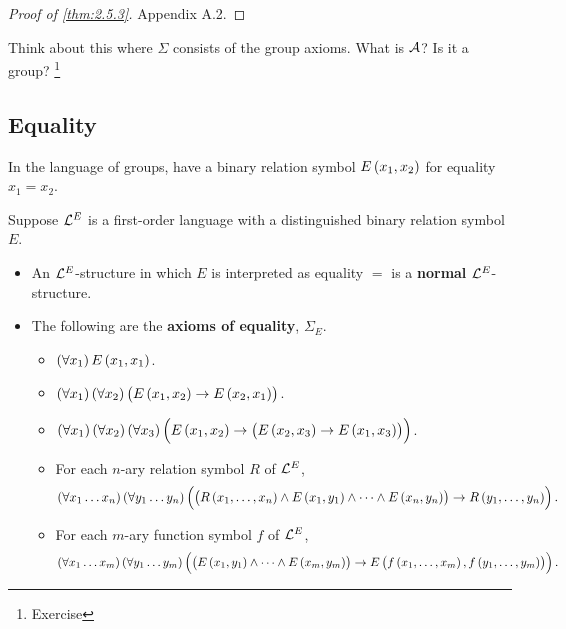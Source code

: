 
\begin{proof}[Proof of \ref{thm:2.5.3}]
Appendix A.2.
\end{proof}

\begin{example*}
Think about this where $ \Sigma $ consists of the group axioms. What is $ \mathcal{A} $? Is it a group? \footnote{Exercise}
\end{example*}

\subsection{Equality}


\begin{example*}
In the language of groups, have a binary relation symbol $ E\br{x_1, x_2} $ for equality $ x_1 = x_2 $.
\end{example*}

\begin{definition}
Suppose $ \mathcal{L}^E $ is a first-order language with a distinguished binary relation symbol $ E $.
\begin{itemize}
\item An $ \mathcal{L}^E $-structure in which $ E $ is interpreted as equality $ = $ is a \textbf{normal} $ \mathcal{L}^E $-structure.
\item The following are the \textbf{axioms of equality}, $ \Sigma_E $.
\begin{itemize}
\item $ \fab{x_1}E\br{x_1, x_1} $.
\item $ \fab{x_1}\fab{x_2}\impb{E\br{x_1, x_2}}{E\br{x_2, x_1}} $.
\item $ \fab{x_1}\fab{x_2}\fab{x_3}\impb{E\br{x_1, x_2}}{\impb{E\br{x_2, x_3}}{E\br{x_1, x_3}}} $.
\item For each $ n $-ary relation symbol $ R $ of $ \mathcal{L}^E $,
$$ \fab{x_1 \dots x_n}\fab{y_1 \dots y_n}\impb{\br{R\br{x_1, \dots, x_n} \land E\br{x_1, y_1} \land \dots \land E\br{x_n, y_n}}}{R\br{y_1, \dots, y_n}}. $$
\item For each $ m $-ary function symbol $ f $ of $ \mathcal{L}^E $,
$$ \fab{x_1 \dots x_m}\fab{y_1 \dots y_m}\impb{\br{E\br{x_1, y_1} \land \dots \land E\br{x_m, y_m}}}{E\br{f\br{x_1, \dots, x_m}, f\br{y_1, \dots, y_m}}}. $$
\end{itemize}
\end{itemize}
\end{definition}

